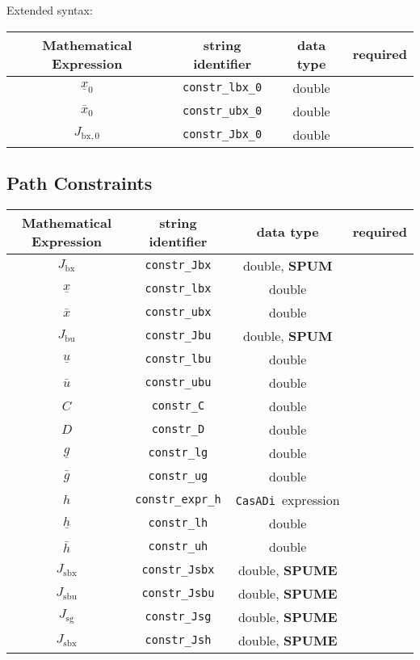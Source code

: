 \documentclass{article}
\newcommand{\code}[1]{\texttt{#1}}
\newcommand{\casadi}{\texttt{CasADi}}
\newcommand{\ind}[1]{_{\textrm{#1}}}
\begin{document}
Extended syntax:
\begin{table}[h]
	\centering
	\begin{tabular}{|c|c|c|c|}
		\toprule
		Mathematical Expression & string identifier & data type & required \\ \midrule
		$ \underline{x}_0 $ & \code{constr\_lbx\_0} & double & \optional \\ 		\bottomrule
		$ \bar{x}_0 $ & \code{constr\_ubx\_0} & double & \optional \\ 		\bottomrule
		$ J_{\textrm{bx},0} $ & \code{constr\_Jbx\_0} & double & \optional \\ 		\bottomrule
	\end{tabular}
\end{table}

\subsection{Path Constraints}
\begin{table}[h]
	\centering
	\begin{tabular}{|c|c|c|c|}
		\toprule
		Mathematical Expression & string identifier & data type & required \\ \midrule
		$J_{\textrm{bx}}$ & \code{constr\_Jbx}    & double, \textbf{SPUM} & \optional  \\
		$\underline{x} $    & \code{constr\_lbx}     & double  & \optional  \\
		$\bar{x} $  & \code{constr\_ubx}     & double  & \optional   \\ \midrule
		$J_{\textrm{bu}}$ & \code{constr\_Jbu}    & double, \textbf{SPUM}   & \optional    \\
		$\underline{u} $    & \code{constr\_lbu}     & double   & \optional   \\
		$\bar{u} $         & \code{constr\_ubu}     & double  & \optional   \\ \midrule
		$C$ & \code{constr\_C}    & double  & \optional \\
		$D $    & \code{constr\_D}     & double  & \optional \\
		$\underline{g} $    & \code{constr\_lg}     & double  & \optional    \\
		$\bar{g} $         & \code{constr\_ug}     & double  & \optional   \\ \midrule
		$ h $ & \code{constr\_expr\_h}    & \casadi~expression  & \optional   \\
		$\underline{h} $    & \code{constr\_lh}     & double   & \optional   \\
		$\bar{h} $         & \code{constr\_uh}     & double  & \optional   \\ \midrule
		$ J\ind{sbx} $ & \code{constr\_Jsbx} & double, \textbf{SPUME} & \optional  \\
		$ J\ind{sbu} $ & \code{constr\_Jsbu} & double, \textbf{SPUME}  & \optional \\
		$ J\ind{sg} $ & \code{constr\_Jsg} & double, \textbf{SPUME} & \optional  \\
		$ J\ind{sbx} $ & \code{constr\_Jsh} & double, \textbf{SPUME}  & \optional  \\
		\bottomrule
	\end{tabular}
\end{table}
\end{document}
